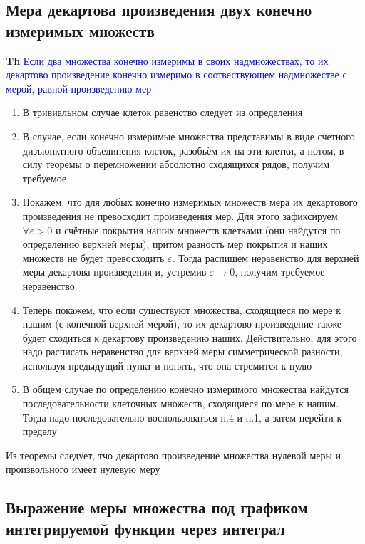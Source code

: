 \subsection{Мера декартова произведения двух конечно измеримых множеств}

\textbf{Th} \textcolor{blue}{Если два множества конечно измеримы в своих надмножествах, то их декартово
произведение конечно измеримо в соотвествующем надмножестве с мерой, равной произведению мер}

\begin{enumerate}
    \item В тривиальном случае клеток равенство следует из определения
    \item В случае, если конечно измеримые множества представимы в виде счетного дизъюнктного объединения клеток,
    разобьём их на эти клетки, а потом, в силу теоремы о перемножении абсолютно сходящихся рядов, получим требуемое
    \item Покажем, что для любых конечно измеримых множеств мера их декартового произведения не превосходит
    произведения мер.
    Для этого зафиксируем $\forall \varepsilon > 0$ и счётные покрытия наших множеств клетками (они найдутся по
    определению верхней меры), притом разность мер покрытия и наших множеств не будет
    превосходить $\varepsilon$.
    Тогда распишем неравенство для верхней меры декартова произведения и, устремив $\varepsilon \rightarrow 0$,
    получим требуемое неравенство
    \item Теперь покажем, что если существуют множества, сходящиеся по мере к нашим (с конечной верхней мерой), то
    их декартово произведение также будет сходиться к декартову произведению наших.
    Действительно, для этого надо расписать неравенство для верхней меры симметрической разности, используя
    предыдущий пункт и понять, что она стремится к нулю
    \item В общем случае по определению конечно измеримого множества найдутся последовательности клеточных
    множеств, сходящиеся по мере к нашим.
    Тогда надо последовательно воспользоваться п.4 и п.1, а затем перейти к пределу
\end{enumerate}

Из теоремы следует, тчо декартово произведение множества нулевой меры и произвольного имеет нулевую меру

 \subsection{Выражение меры множества под графиком интегрируемой функции через интеграл}

